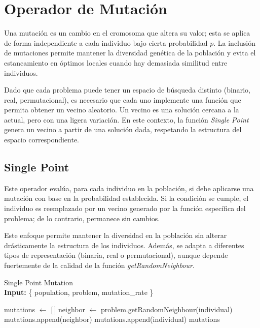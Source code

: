 \chapter{Operador de Mutación}

Una mutación es un cambio en el cromosoma que altera su valor; esta se aplica de forma independiente a cada individuo bajo cierta probabilidad $p$. La inclusión de mutaciones permite mantener la diversidad genética de la población y evita el estancamiento en óptimos locales cuando hay demasiada similitud entre individuos.

Dado que cada problema puede tener un espacio de búsqueda distinto (binario, real, permutacional), es necesario que cada uno implemente una función que permita obtener un vecino aleatorio. Un vecino es una solución cercana a la actual, pero con una ligera variación. En este contexto, la función \textit{Single Point} genera un vecino a partir de una solución dada, respetando la estructura del espacio correspondiente.

\section{Single Point}

Este operador evalúa, para cada individuo en la población, si debe aplicarse una mutación con base en la probabilidad establecida. Si la condición se cumple, el individuo es reemplazado por un vecino generado por la función específica del problema; de lo contrario, permanece sin cambios.

Este enfoque permite mantener la diversidad en la población sin alterar drásticamente la estructura de los individuos. Además, se adapta a diferentes tipos de representación (binaria, real o permutacional), aunque depende fuertemente de la calidad de la función \textit{getRandomNeighbour}.

\begin{algorithm}[H]
	\caption{Single Point Mutation \\ \textbf{Input:} \{ population, problem, mutation\_rate \}}
	\begin{algorithmic}[1]
		\State mutations $\gets$ [\,]
		\State neighbor $\gets$ problem.getRandomNeighbour(individual)
		\State mutations.append(neighbor)
		\Else
		\State mutations.append(individual)
		\EndIf
		\EndFor
		\State \Return mutations
		\EndFunction
	\end{algorithmic}
	\label{alg:mutation_single}
\end{algorithm}
